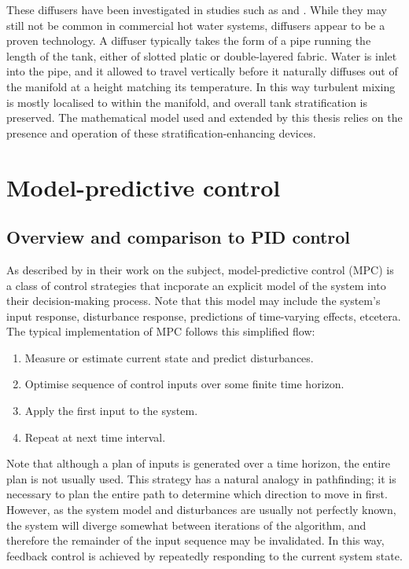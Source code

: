 These diffusers have been investigated in studies such as \textcite{Andersen08} and \textcite{Gari82}.
While they may still not be common in commercial hot water systems, diffusers appear to be a proven technology.
A diffuser typically takes the form of a pipe running the length of the tank, either of slotted platic or double-layered fabric.
Water is inlet into the pipe, and it allowed to travel vertically before it naturally diffuses out of the manifold at a height matching its temperature.
In this way turbulent mixing is mostly localised to within the manifold, and overall tank stratification is preserved.
The mathematical model used and extended by this thesis relies on the presence and operation of these stratification-enhancing devices.

\section{Model-predictive control}

\subsection{Overview and comparison to PID control}

As described by \textcite{Camacho04} in their work on the subject, model-predictive control (MPC) is a class of control strategies that incporate an explicit model of the system into their decision-making process.
Note that this model may include the system's input response, disturbance response, predictions of time-varying effects, etcetera.
The typical implementation of MPC follows this simplified flow:

\begin{enumerate}
   \item Measure or estimate current state and predict disturbances.
   \item Optimise sequence of control inputs over some finite time horizon.
   \item Apply the first input to the system.
   \item Repeat at next time interval.
\end{enumerate}

Note that although a plan of inputs is generated over a time horizon, the entire plan is not usually used.
This strategy has a natural analogy in pathfinding; it is necessary to plan the entire path to determine which direction to move in first.
However, as the system model and disturbances are usually not perfectly known, the system will diverge somewhat between iterations of the algorithm, and therefore the remainder of the input sequence may be invalidated.
In this way, feedback control is achieved by repeatedly responding to the current system state.

